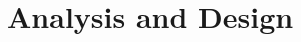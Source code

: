 \documentclass[../Report.tex]{subfiles}
\begin{document}
\chapter{Analysis and Design}
\end{document}
